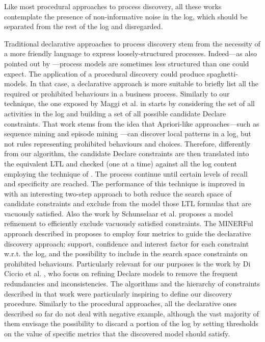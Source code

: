 \documentclass[a4wide,11pt]{article}
\theoremstyle{definition}
\theoremstyle{plain}
\begin{document}
Like most procedural approaches to process discovery, all these works contemplate the presence of non-informative noise in the log, which should be separated from the rest of the log and disregarded.
 
Traditional declarative approaches to process discovery stem from the necessity of a more friendly language to express loosely-structured processes. Indeed---as also pointed out by \cite{2012-Maggi}---process models are sometimes less structured than one could expect. The application of a procedural discovery could produce spaghetti-models. In that case, a declarative approach is more suitable to briefly list all the required or prohibited behaviours in a business process.
Similarly to our technique, the one exposed by Maggi et al. in \cite{2011-Maggi} starts by considering the set of all activities in the log and building a set of all possible candidate Declare constraints. That work stems from the idea that Apriori-like approaches---such as sequence mining \cite{1994-Agrawal} and episode mining \cite{1997-Mannila}---can discover local patterns in a log, but not rules representing prohibited behaviours and choices. Therefore, differently from our algorithm, the candidate Declare constraints are then translated into the equivalent \ac{LTL} and checked (one at a time) against all the log content employing the technique of \cite{2005-Aalst}. The process continue until certain levels of recall and specificity are reached. The performance of this technique is improved in \cite{2012-Maggi} with an interesting two-step approach to both reduce the search space of candidate constraints and exclude from the model those \ac{LTL} formulas that are vacuously satisfied.
Also the work \cite{2012-Schunselaar} by Schunselaar et al. proposes a model refinement to efficiently exclude vacuously satisfied constraints. %
The MINERFul approach described in \cite{2015-DiCiccio} proposes to employ four metrics to guide the declarative discovery approach: support, confidence and interest factor for each constraint w.r.t. the log, and the possibility to include in the search space constraints on prohibited behaviours.
Particularly relevant for our purposes is the work by Di Ciccio et al. \cite{2017-DiCiccio}, who focus on refining Declare models to remove the frequent redundancies and inconsistencies. The algorithms and the hierarchy of constraints described in that work were particularly inspiring to define our discovery procedure.
Similarly to the procedural approaches, all the declarative ones described so far do not deal with negative example, although the vast majority of them envisage the possibility to discard a portion of the log by setting thresholds on the value of specific metrics that the discovered model should satisfy.
 
\end{document}
